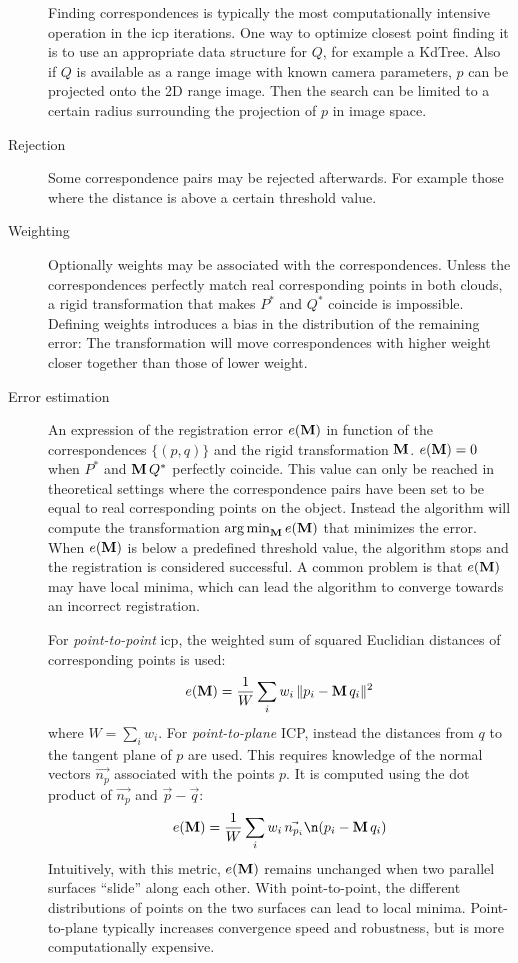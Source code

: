 \begin{description}
Finding correspondences is typically the most computationally intensive operation in the \gls{icp} iterations. One way to optimize closest point finding it is to use an appropriate data structure for $Q$, for example a KdTree. Also if $Q$ is available as a range image with known camera parameters, $p$ can be projected onto the 2D range image. Then the search can be limited to a certain radius surrounding the projection of $p$ in image space.
\item[Rejection] Some correspondence pairs may be rejected afterwards. For example those where the distance is above a certain threshold value.
\item[Weighting] Optionally weights may be associated with the correspondences. Unless the correspondences perfectly match real corresponding points in both clouds, a rigid transformation that makes $P^*$ and $Q^*$ coincide is impossible. Defining weights introduces a bias in the distribution of the remaining error: The transformation will move correspondences with higher weight closer together than those of lower weight.
\item[Error estimation] An expression of the registration error $e(\mathbf{M})$ in function of the correspondences $\{ (p, q) \}$ and the rigid transformation $\mathbf{M}$. $e(\mathbf{M}) = 0$ when $P^*$ and $\mathbf{M} \, Q^*$ perfectly coincide. This value can only be reached in theoretical settings where the correspondence pairs have been set to be equal to real corresponding points on the object. Instead the algorithm will compute the transformation $\operatorname*{arg\,min}_{\mathbf{M}} e(\mathbf{M})$ that minimizes the error. When $e(\mathbf{M})$ is below a predefined threshold value, the algorithm stops and the registration is considered successful. A common problem is that $e(\mathbf{M})$ may have local minima, which can lead the algorithm to converge towards an incorrect registration. 

For \emph{point-to-point} \gls{icp}, the weighted sum of squared Euclidian distances of corresponding points is used:
$$
e(\mathbf{M}) = \frac{1}{W} \sum_{i} w_i \, \| p_i - \mathbf{M} \, q_i \|^2
$$
where $W = \sum_i w_i$. For \emph{point-to-plane} ICP, instead the distances from $q$ to the tangent plane of $p$ are used. This requires knowledge of the normal vectors $\vec{n_p}$ associated with the points $p$. It is computed using the dot product of $\vec{n_p}$ and $\vec{p} - \vec{q}$:
$$
e(\matr{M}) = \frac{1}{W} \sum_{i} w_i \, \vec{n_{p_i}} \n (p_i - \matr{M} \, q_i)
$$
Intuitively, with this metric, $e(\mathbf{M})$ remains unchanged when two parallel surfaces ``slide'' along each other. With point-to-point, the different distributions of points on the two surfaces can lead to local minima. Point-to-plane typically increases convergence speed and robustness, but is more computationally expensive.


\end{description}
